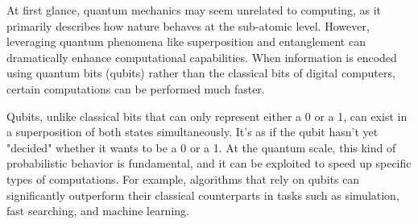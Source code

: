




At first glance, quantum mechanics may seem unrelated to computing, as it primarily describes how nature behaves at the sub-atomic level.
However, leveraging quantum phenomena like superposition and entanglement can dramatically enhance computational capabilities.
When information is encoded using quantum bits (qubits) rather than the classical bits of digital computers, certain computations can be performed much faster.

Qubits, unlike classical bits that can only represent either a 0 or a 1, can exist in a superposition of both states simultaneously.
It's as if the qubit hasn't yet "decided" whether it wants to be a 0 or a 1.
At the quantum scale, this kind of probabilistic behavior is fundamental, and it can be exploited to speed up specific types of computations.
For example, algorithms that rely on qubits can significantly outperform their classical counterparts in tasks such as simulation, fast searching, and machine learning.

